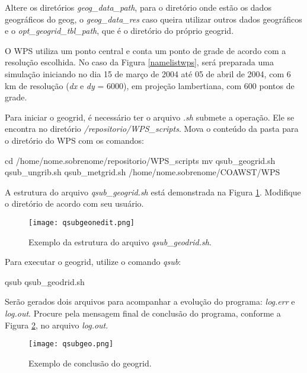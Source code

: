 \noindent Altere os diretórios \textit{geog\_data\_path}, para o diretório onde estão os dados geográficos do geog, o \textit{geog\_data\_res} caso queira utilizar outros dados geográficos e o \textit{opt\_geogrid\_tbl\_path}, que é o diretório do próprio geogrid.
\bigskip

\noindent O WPS utiliza um ponto central e conta um ponto de grade de acordo com a resolução escolhida. No caso da Figura \textcolor{bleu_cite}{\ref{namelistwps}}, será preparada uma simulação iniciando no dia 15 de março de 2004 até 05 de abril de 2004, com 6 km de resolução (\textit{dx} e \textit{dy} = 6000), em projeção lambertiana, com 600 pontos de grade.
\bigskip

\noindent Para iniciar o geogrid, é necessário ter o arquivo \textit{.sh} submete a operação. Ele se encontra no diretório \textit{/repositorio/WPS\_scripts}. Mova o conteúdo da pasta para o diretório do WPS com os comandos:
\bigskip

\begin{bashcode}[fontsize=\footnotesize]
cd /home/nome.sobrenome/repositorio/WPS_scripts
mv qsub_geogrid.sh qsub_ungrib.sh qsub_metgrid.sh /home/nome.sobrenome/COAWST/WPS
\end{bashcode}
\bigskip

\noindent A estrutura do arquivo \textit{qsub\_geogrid.sh} está demonstrada na Figura \textcolor{bleu_cite}{\ref{qsubgeonedit}}. Modifique o diretório de acordo com seu usuário.
\bigskip

\begin{figure}[H]
    \centering
    \texttt{[image: qsubgeonedit.png]}
    \caption{Exemplo da estrutura do arquivo \textit{qsub\_geodrid.sh}.}
    \label{qsubgeonedit}
\end{figure}
\bigskip

\noindent Para executar o geogrid, utilize o comando \textit{qsub}:
\bigskip

\begin{bashcode}
qsub qsub_geodrid.sh
\end{bashcode}
\bigskip

\noindent Serão gerados dois arquivos para acompanhar a evolução do programa: \textit{log.err} e \textit{log.out}. Procure pela mensagem final de conclusão do programa, conforme a Figura \textcolor{bleu_cite}{\ref{qsubgeofinal}}, no arquivo \textit{log.out}.
\bigskip

\begin{figure}[H]
    \centering
    \texttt{[image: qsubgeo.png]}
    \caption{Exemplo de conclusão do geogrid.}
    \label{qsubgeofinal}
\end{figure}
\bigskip

